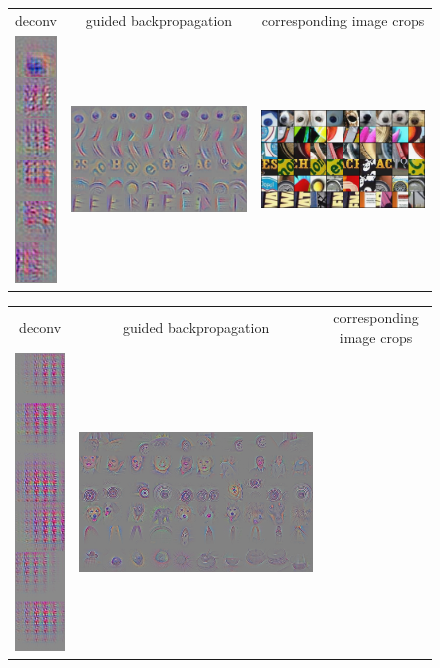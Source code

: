 \documentclass{article} %
\begin{document}
\begin{figure}
\hspace*{-.0cm}
\begin{tabular}{ccc}
  deconv & guided backpropagation & corresponding image crops \\
  \includegraphics[height=.25\textwidth]{maxactiv_pool2_zeiler_stride.png} &
  \includegraphics[height=.25\textwidth]{maxactiv_pool2_tobi_stride.png} &
  \includegraphics[height=.25\textwidth]{maxactiv_pool2_img_crop.png} \\
\end{tabular}
\hspace*{-.0cm}
\begin{tabular}{ccc}
  deconv & guided backpropagation & corresponding image crops \\
  \includegraphics[height=.25\textwidth]{maxactiv_pool3_zeiler_stride.png} &
  \includegraphics[height=.25\textwidth]{maxactiv_pool3_tobi_stride.png} &

\end{tabular}
\end{figure}
\end{document}
